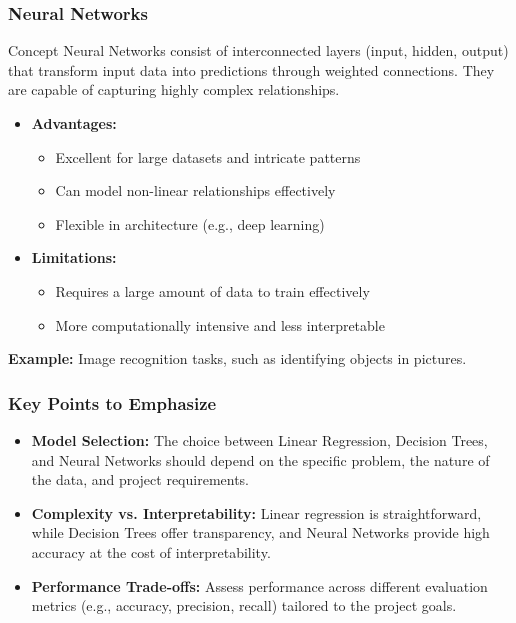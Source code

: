 \documentclass[aspectratio=169]{beamer}
\begin{document}
\begin{frame}[fragile]
    \frametitle{Neural Networks}
    \begin{block}{Concept}
        Neural Networks consist of interconnected layers (input, hidden, output) that transform input data into predictions 
        through weighted connections. They are capable of capturing highly complex relationships.
    \end{block}

    \begin{itemize}
        \item \textbf{Advantages:}
        \begin{itemize}
            \item Excellent for large datasets and intricate patterns
            \item Can model non-linear relationships effectively
            \item Flexible in architecture (e.g., deep learning)
        \end{itemize}
        
        \item \textbf{Limitations:}
        \begin{itemize}
            \item Requires a large amount of data to train effectively
            \item More computationally intensive and less interpretable
        \end{itemize}
    \end{itemize}
    
    \textbf{Example:} Image recognition tasks, such as identifying objects in pictures.
\end{frame}

\begin{frame}[fragile]
    \frametitle{Key Points to Emphasize}
    \begin{itemize}
        \item \textbf{Model Selection:} 
        The choice between Linear Regression, Decision Trees, and Neural Networks should depend on the specific problem, 
        the nature of the data, and project requirements.
        
        \item \textbf{Complexity vs. Interpretability:} 
        Linear regression is straightforward, while Decision Trees offer transparency, and Neural Networks provide high accuracy 
        at the cost of interpretability.
        
        \item \textbf{Performance Trade-offs:} 
        Assess performance across different evaluation metrics (e.g., accuracy, precision, recall) tailored to the project goals.
    \end{itemize}
\end{frame}
\end{document}
